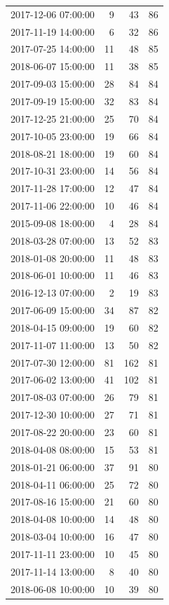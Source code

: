 \begin{tabular}{lrrr}
2017-12-06 07:00:00 & 9 & 43 & 86 \\
2017-11-19 14:00:00 & 6 & 32 & 86 \\
2017-07-25 14:00:00 & 11 & 48 & 85 \\
2018-06-07 15:00:00 & 11 & 38 & 85 \\
2017-09-03 15:00:00 & 28 & 84 & 84 \\
2017-09-19 15:00:00 & 32 & 83 & 84 \\
2017-12-25 21:00:00 & 25 & 70 & 84 \\
2017-10-05 23:00:00 & 19 & 66 & 84 \\
2018-08-21 18:00:00 & 19 & 60 & 84 \\
2017-10-31 23:00:00 & 14 & 56 & 84 \\
2017-11-28 17:00:00 & 12 & 47 & 84 \\
2017-11-06 22:00:00 & 10 & 46 & 84 \\
2015-09-08 18:00:00 & 4 & 28 & 84 \\
2018-03-28 07:00:00 & 13 & 52 & 83 \\
2018-01-08 20:00:00 & 11 & 48 & 83 \\
2018-06-01 10:00:00 & 11 & 46 & 83 \\
2016-12-13 07:00:00 & 2 & 19 & 83 \\
2017-06-09 15:00:00 & 34 & 87 & 82 \\
2018-04-15 09:00:00 & 19 & 60 & 82 \\
2017-11-07 11:00:00 & 13 & 50 & 82 \\
2017-07-30 12:00:00 & 81 & 162 & 81 \\
2017-06-02 13:00:00 & 41 & 102 & 81 \\
2017-08-03 07:00:00 & 26 & 79 & 81 \\
2017-12-30 10:00:00 & 27 & 71 & 81 \\
2017-08-22 20:00:00 & 23 & 60 & 81 \\
2018-04-08 08:00:00 & 15 & 53 & 81 \\
2018-01-21 06:00:00 & 37 & 91 & 80 \\
2018-04-11 06:00:00 & 25 & 72 & 80 \\
2017-08-16 15:00:00 & 21 & 60 & 80 \\
2018-04-08 10:00:00 & 14 & 48 & 80 \\
2018-03-04 10:00:00 & 16 & 47 & 80 \\
2017-11-11 23:00:00 & 10 & 45 & 80 \\
2017-11-14 13:00:00 & 8 & 40 & 80 \\
2018-06-08 10:00:00 & 10 & 39 & 80 \\

\end{tabular}
